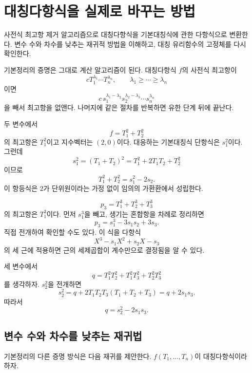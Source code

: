 \clearpage
\section{대칭다항식을 실제로 바꾸는 방법}
\label{sec:symmetric-reduction-algorithm}

\begin{learninggoal}
사전식 최고항 제거 알고리즘으로 대칭다항식을 기본대칭식에 관한 다항식으로 변환한다. 변수 수와 차수를 낮추는 재귀적 방법을 이해하고, 대칭 유리함수의 고정체를 다시 확인한다.
\end{learninggoal}

기본정리의 증명은 그대로 계산 알고리즘이 된다. 대칭다항식 $f$의 사전식 최고항이
\[
  cT_1^{\lambda_1}\cdots T_n^{\lambda_n},
  \qquad
  \lambda_1\ge\cdots\ge\lambda_n
\]
이면
\[
  c\,s_1^{\lambda_1-\lambda_2}
  s_2^{\lambda_2-\lambda_3}\cdots s_n^{\lambda_n}
\]
을 빼서 최고항을 없앤다. 나머지에 같은 절차를 반복하면 유한 단계 뒤에 끝난다.

\begin{example}[제곱합]
두 변수에서
\[
  f=T_1^2+T_2^2
\]
의 최고항은 $T_1^2$이고 지수벡터는 $(2,0)$이다. 대응하는 기본대칭식 단항식은 $s_1^2$이다. 그런데
\[
  s_1^2=(T_1+T_2)^2
  =T_1^2+2T_1T_2+T_2^2
\]
이므로
\[
  T_1^2+T_2^2=s_1^2-2s_2.
\]
이 항등식은 $2$가 단위원이라는 가정 없이 임의의 가환환에서 성립한다.
\end{example}

\begin{example}
\label{ex:cubic-power-sum}
\[
  p_3=T_1^3+T_2^3+T_3^3
\]
의 최고항은 $T_1^3$이다. 먼저 $s_1^3$을 빼고, 생기는 혼합항을 차례로 정리하면
\[
  p_3=s_1^3-3s_1s_2+3s_3.
\]
직접 전개하여 확인할 수도 있다. 이 식을 다항식
\[
  X^3-s_1X^2+s_2X-s_3
\]
의 세 근에 적용하면 근의 세제곱합이 계수만으로 결정됨을 알 수 있다.
\end{example}

\begin{example}
세 변수에서
\[
  q=T_1^2T_2^2+T_1^2T_3^2+T_2^2T_3^2
\]
를 생각하자. $s_2^2$을 전개하면
\[
  s_2^2=q+2T_1T_2T_3(T_1+T_2+T_3)
  =q+2s_1s_3.
\]
따라서
\[
  q=s_2^2-2s_1s_3.
\]
\end{example}

\subsection{변수 수와 차수를 낮추는 재귀법}

기본정리의 다른 증명 방식은 다음 재귀를 제안한다. $f(T_1,\dots,T_n)$이 대칭다항식이라 하자.

